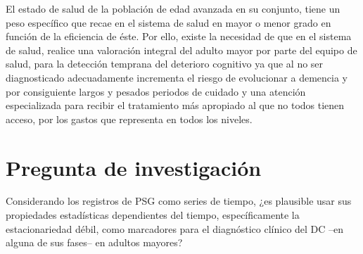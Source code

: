 
El estado de salud de la poblaci\'on de edad avanzada en su conjunto, tiene un peso espec\'ifico 
que recae en el sistema de salud en mayor o menor grado en funci\'on de la eficiencia de \'este. 
Por ello, existe la necesidad de que en el sistema de salud, realice una valoración integral del 
adulto mayor por parte del equipo de salud, para la detecci\'on temprana del deterioro cognitivo ya 
que  
al no ser diagnosticado adecuadamente incrementa el riesgo de evolucionar a demencia y por 
consiguiente largos y pesados periodos de cuidado y una atenci\'on especializada para recibir el 
tratamiento m\'as apropiado al que no todos tienen acceso, por los gastos que representa en todos 
los niveles. 



\section{Pregunta de investigaci\'on}

Considerando los registros de PSG como series de tiempo,
¿es plausible usar sus propiedades estad\'isticas dependientes del tiempo, espec\'ificamente
la estacionariedad d\'ebil,
como marcadores para el diagn\'ostico cl\'inico del DC --en alguna de 
sus fases-- en adultos mayores?


